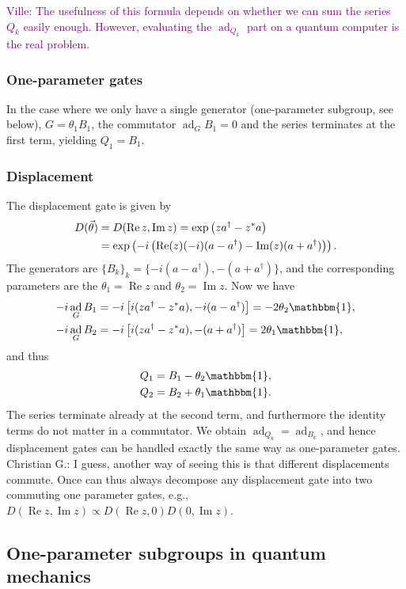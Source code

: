 \documentclass[aps,pra,10pt,twocolumn,groupedaddress,nofootinbib]{revtex4-1}
\theoremstyle{plain}
\DeclareMathOperator{\re}{Re}
\DeclareMathOperator{\im}{Im}
\DeclareMathOperator{\ad}{ad}
\newcommand{\I}{\mathbbm{1}} %
\newcommand{\comm}[2]{\ensuremath{\left[#1, #2\right]}}             %
\newcommand{\ville}[1]{\textcolor{purple}{Ville: #1}}
\newcommand{\cg}[1]{\textcolor{cyan!80!black}{Christian G.: #1}}
\begin{document}
\ville{The usefulness of this formula depends on whether we can sum the series~$Q_k$ easily enough.
  However, evaluating the $\ad_{Q_k}$ part on a quantum computer is the real problem.
}

\subsubsection{One-parameter gates}

In the case where we only have a single generator (one-parameter subgroup, see below),
$G = \theta_1 B_1$, the commutator $\ad_G B_1 = 0$
and the series terminates at the first term, yielding
$Q_1 = B_1$.

\subsubsection{Displacement}

The displacement gate is given by
\begin{align}
  D(\vec{\theta}) &= D(\re z, \im z) = \exp\left( za^\dagger -z^* a\right)\\
  \notag
&= \exp\left(-i\left(\re(z)(-i)(a-a^\dagger) -\im(z)(a+a^\dagger)\right)\right).
\end{align}
The generators are $\{B_k\}_k = \{-i(a-a^\dagger), -(a+a^\dagger)\}$,
and the corresponding parameters are the $\theta_1 = \re z$ and $\theta_2 = \im z$.
Now we have
\begin{align*}
  -i \ad_G B_1 &= -i\comm{i(za^\dagger -z^* a)}{-i(a-a^\dagger)}
  = -2 \theta_2 \I,\\
  -i\ad_G B_2 &= -i\comm{i(za^\dagger -z^* a)}{-(a+a^\dagger)}
  = 2 \theta_1 \I,
\end{align*}
and thus
\begin{align*}
Q_1 &= B_1 -\theta_{2} \I,\\
Q_2 &= B_2 +\theta_{1} \I.
\end{align*}
The series terminate already at the second term, and furthermore
the identity terms do not matter in a commutator.
We obtain $\ad_{Q_k} = \ad_{B_k}$, and
hence displacement gates can be handled exactly the same way as one-parameter gates.
\cg{I guess, another way of seeing this is that different displacements commute. Once can thus always decompose any displacement gate into two commuting one parameter gates, e.g., $D(\re z, \im z) \propto D(\re z, 0) D(0, \im z)$.}

\subsection{One-parameter subgroups in quantum mechanics}
\end{document}
